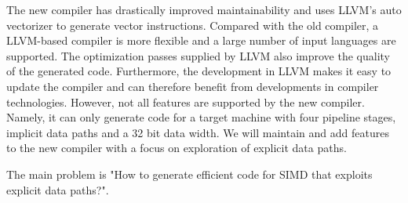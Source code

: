The new compiler has drastically improved maintainability and uses LLVM's auto vectorizer to generate vector instructions. Compared with the old compiler, a LLVM-based compiler is more flexible and a large number of input languages are supported. The optimization passes supplied by LLVM also improve the quality of the generated code. Furthermore, the development in LLVM makes it easy to update the compiler and can therefore benefit from developments in compiler technologies. However, not all features are supported by the new compiler. Namely, it can only generate code for a target machine with four pipeline stages, implicit data paths and a 32 bit data width. We will maintain and add features to the new compiler with a focus on exploration of explicit data paths.

The main problem is "How to generate efficient code for SIMD that exploits explicit data paths?". 





